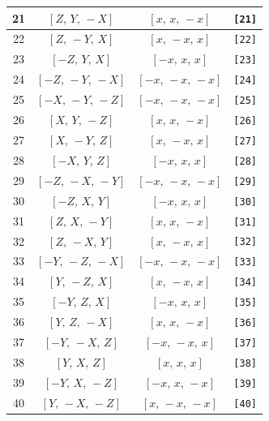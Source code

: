 \documentclass[fleqn,8pt]{jsarticle}
\begin{document}
\begin{longtable}{cccc}
21 & $\left[ Z,\, Y,\, - X \right]$ & $\left[ x,\, x,\, - x \right]$ & {\tt [21]} \\ \hline
22 & $\left[ Z,\, - Y,\, X \right]$ & $\left[ x,\, - x,\, x \right]$ & {\tt [22]} \\ \hline
23 & $\left[ - Z,\, Y,\, X \right]$ & $\left[ - x,\, x,\, x \right]$ & {\tt [23]} \\ \hline
24 & $\left[ - Z,\, - Y,\, - X \right]$ & $\left[ - x,\, - x,\, - x \right]$ & {\tt [24]} \\ \hline
25 & $\left[ - X,\, - Y,\, - Z \right]$ & $\left[ - x,\, - x,\, - x \right]$ & {\tt [25]} \\ \hline
26 & $\left[ X,\, Y,\, - Z \right]$ & $\left[ x,\, x,\, - x \right]$ & {\tt [26]} \\ \hline
27 & $\left[ X,\, - Y,\, Z \right]$ & $\left[ x,\, - x,\, x \right]$ & {\tt [27]} \\ \hline
28 & $\left[ - X,\, Y,\, Z \right]$ & $\left[ - x,\, x,\, x \right]$ & {\tt [28]} \\ \hline
29 & $\left[ - Z,\, - X,\, - Y \right]$ & $\left[ - x,\, - x,\, - x \right]$ & {\tt [29]} \\ \hline
30 & $\left[ - Z,\, X,\, Y \right]$ & $\left[ - x,\, x,\, x \right]$ & {\tt [30]} \\ \hline
31 & $\left[ Z,\, X,\, - Y \right]$ & $\left[ x,\, x,\, - x \right]$ & {\tt [31]} \\ \hline
32 & $\left[ Z,\, - X,\, Y \right]$ & $\left[ x,\, - x,\, x \right]$ & {\tt [32]} \\ \hline
33 & $\left[ - Y,\, - Z,\, - X \right]$ & $\left[ - x,\, - x,\, - x \right]$ & {\tt [33]} \\ \hline
34 & $\left[ Y,\, - Z,\, X \right]$ & $\left[ x,\, - x,\, x \right]$ & {\tt [34]} \\ \hline
35 & $\left[ - Y,\, Z,\, X \right]$ & $\left[ - x,\, x,\, x \right]$ & {\tt [35]} \\ \hline
36 & $\left[ Y,\, Z,\, - X \right]$ & $\left[ x,\, x,\, - x \right]$ & {\tt [36]} \\ \hline
37 & $\left[ - Y,\, - X,\, Z \right]$ & $\left[ - x,\, - x,\, x \right]$ & {\tt [37]} \\ \hline
38 & $\left[ Y,\, X,\, Z \right]$ & $\left[ x,\, x,\, x \right]$ & {\tt [38]} \\ \hline
39 & $\left[ - Y,\, X,\, - Z \right]$ & $\left[ - x,\, x,\, - x \right]$ & {\tt [39]} \\ \hline
40 & $\left[ Y,\, - X,\, - Z \right]$ & $\left[ x,\, - x,\, - x \right]$ & {\tt [40]} \\ \hline

\end{longtable}
\end{document}
